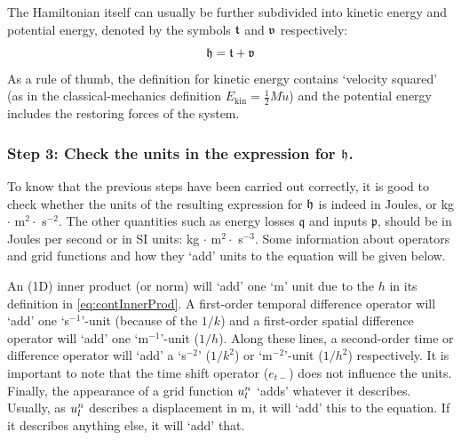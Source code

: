 {{The Hamiltonian itself can usually be further subdivided into kinetic energy and potential energy, denoted by the symbols $\mathfrak{t}$ and $\mathfrak{v}$ respectively:
\begin{equation}
    \mathfrak{h} = \mathfrak{t} + \mathfrak{v}
\end{equation}
As a rule of thumb, the definition for kinetic energy contains `velocity squared' (as in the classical-mechanics definition $E_\text{kin}=\tfrac{1}{2}M\dot u$) and the potential energy includes the restoring forces of the system. 

\subsubsection{Step 3: Check the units in the expression for $\mathfrak{h}$.}
To know that the previous steps have been carried out correctly, it is good to check whether the units of the resulting expression for $\mathfrak{h}$ is indeed in Joules, or kg $\cdot$ m$^2 \cdot $ s$^{-2}$. The other quantities such as energy losses $\mathfrak{q}$ and inputs $\mathfrak{p}$, should be in Joules per second or in SI units: kg $\cdot$ m$^2 \cdot $ s$^{-3}$. Some information about operators and grid functions and how they `add' units to the equation will be given below.

An (1D) inner product (or norm) will `add' one `m' unit due to the $h$ in its definition in \eqref{eq:contInnerProd}. A first-order temporal difference operator will `add' one `s$^{-1}$'-unit (because of the $1/k$) and a first-order spatial difference operator will `add' one `m$^{-1}$'-unit ($1/h$). Along these lines, a second-order time or difference operator will `add' a `s$^{-2}$' ($1/k^2$) or `m$^{-2}$'-unit ($1/h^2$) respectively. It is important to note that the time shift operator ($e_{t-}$) does not influence the units. Finally, the appearance of a grid function $u_l^n$ `adds' whatever it describes. Usually, as $u_l^n$ describes a displacement in m, it will `add' this to the equation. If it describes anything else, it will `add' that.

}}
